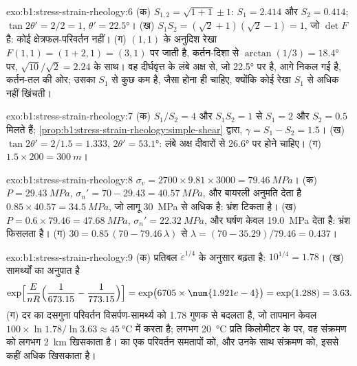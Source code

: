 \begin{solution}{exo:b1:stress-strain-rheology:6}
(क) $S_{1,2} = \sqrt{1 + 1} \pm 1$: $S_1 = 2.414$ और $S_2 = 0.414$;
$\tan2\theta' = 2/2 = 1$, $\theta' = \ang{22.5}$। (ख) $S_1S_2 =
(\sqrt2 + 1)(\sqrt2 - 1) = 1$, जो $\det F$ है: कोई क्षेत्रफल-परिवर्तन नहीं। (ग) $(1, 1)$ के अनुदिश रेखा $F(1, 1) = (1 + 2, 1) = (3, 1)$ पर जाती है, कर्तन-दिशा से $\arctan(1/3) = \ang{18.4}$ पर, 
$\sqrt{10}/\sqrt2 = 2.24$ के साथ। वह दीर्घवृत्त के लंबे अक्ष से, जो \ang{22.5} पर है, आगे निकल गई है, कर्तन-तल की ओर; उसका 
$S_1$ से कुछ कम है, जैसा होना ही चाहिए, क्योंकि कोई रेखा $S_1$ से अधिक नहीं खिंचती।
\end{solution}

\begin{solution}{exo:b1:stress-strain-rheology:7}
(क) $S_1/S_2 = 4$ और $S_1S_2 = 1$ से $S_1 = 2$ और $S_2 = 0.5$ मिलते हैं;
\cref{prop:b1:stress-strain-rheology:simple-shear} द्वारा, $\gamma = S_1 - S_2 =
1.5$। (ख) $\tan2\theta' = 2/1.5 = 1.333$, $2\theta' = \ang{53.1}$: लंबे
अक्ष दीवारों से \ang{26.6} पर होने चाहिए। (ग) $1.5\times200 = \qty{300}{m}$।
\end{solution}

\begin{solution}{exo:b1:stress-strain-rheology:8}
$\sigma_v = 2700\times9.81\times3000 = \qty{79.46}{MPa}$। (क) $P = \qty{29.43}{MPa}$,
$\sigma_n' = 70 - 29.43 = \qty{40.57}{MPa}$, और बायरली अनुमति देता है
$0.85\times40.57 = \qty{34.5}{MPa}$, जो लागू \qty{30}{MPa} से अधिक है: भ्रंश टिकता है। (ख) $P = 0.6\times79.46 = \qty{47.68}{MPa}$, $\sigma_n' =
\qty{22.32}{MPa}$, और घर्षण केवल \qty{19.0}{MPa} देता है: भ्रंश
फिसलता है। (ग) $30 = 0.85\,(70 - 79.46\,\lambda)$ से $\lambda = (70 -
35.29)/79.46 = 0.437$।
\end{solution}

\begin{solution}{exo:b1:stress-strain-rheology:9}
(क) प्रतिबल $\dot\varepsilon^{1/4}$ के अनुसार बढ़ता है: $10^{1/4} = 1.78$। (ख) सामर्थ्यों का
अनुपात है
\[
  \exp\Bigl[\frac{E}{nR}\Bigl(\frac{1}{673.15} - \frac{1}{773.15}\Bigr)\Bigr]
  = \exp\bigl(6705\times\num{1.921e-4}\bigr) = \exp(1.288) = 3.63 .
\]
(ग) दर का दसगुना परिवर्तन विसर्पण-सामर्थ्य को 1.78 गुणक से बदलता है,
जो तापमान केवल $100\times\ln1.78/\ln3.63 \approx
\qty{45}{\degreeCelsius}$ में करता है; लगभग \qty{20}{\degreeCelsius} प्रति किलोमीटर के  पर, वह संक्रमण को लगभग \qty{2}{km} खिसकाता है।  का एक परिवर्तन समतापों को, और उनके साथ संक्रमण को, इससे कहीं अधिक खिसकाता है।
\end{solution}

